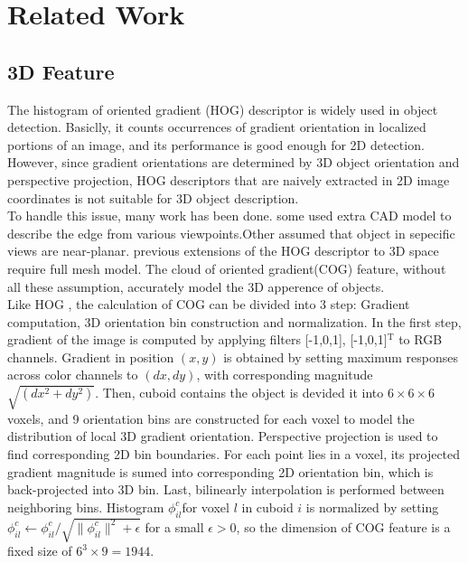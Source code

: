 \documentclass[english]{ccdconf}
\begin{document}
\section{Related Work}

\subsection{3D Feature}
The histogram of oriented gradient (HOG) descriptor \cite{dalal2005histograms} is widely used in object detection. Basiclly, it counts occurrences of gradient orientation in localized portions of an image, and its performance is good enough for 2D detection.  However, since gradient orientations are determined by 3D object orientation and perspective projection, HOG descriptors that are naively extracted in 2D image coordinates is not suitable for 3D object description.\\
To handle this issue, many work has been done. some used extra CAD model to describe the edge from various viewpoints\cite{aubry2014seeing}.Other assumed that object in sepecific views are near-planar\cite{fidler20123d}. previous extensions of the HOG descriptor  to 3D space require full mesh model\cite{buch20093d}. The cloud of oriented gradient(COG) feature, without all these assumption, accurately model the 3D apperence of objects.\\
Like HOG , the calculation of COG can be divided into 3 step: Gradient computation, 3D orientation bin construction and normalization. In the first step, gradient of the image is computed by applying filters [-1,0,1], [-1,0,1]$^\mathrm{T}$ to RGB channels. Gradient in position $(x,y)$ is obtained by setting  maximum responses across
color channels to $(dx,dy)$, with corresponding magnitude $\sqrt{(dx^2+dy^2)}$.
Then, cuboid contains the object is devided it into $6\times6\times6$ voxels, and 9 orientation bins are constructed for each voxel to model the distribution of local 3D gradient orientation. Perspective projection is used to find corresponding 2D bin boundaries. For each point lies in a voxel, its projected gradient magnitude is sumed into corresponding 2D orientation bin, which is back-projected into 3D bin. Last, bilinearly interpolation is performed between neighboring bins.
 Histogram $\phi_{il}^c$for voxel $l$ in cuboid $i$ is normalized by setting $\phi_{il}^c \leftarrow \phi_{il}^c / \sqrt{\|\phi_{il}^c \|^2+ \epsilon}$ for a small $\epsilon>0$, so the dimension of COG feature is a fixed size of $6^3\times9=1944$.
\end{document}
